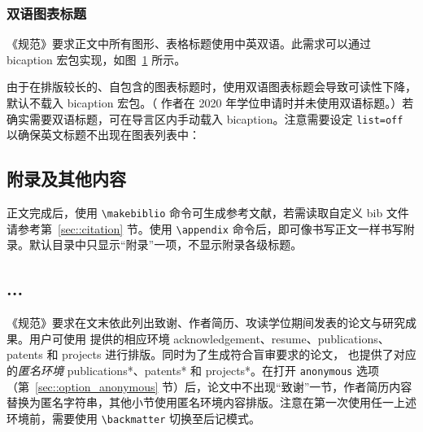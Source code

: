\documentclass[doctor]{shtthesis}
\begin{document}
\subsection{双语图表标题}
《规范》要求正文中所有图形、表格标题使用中英双语。此需求可以通过 \textsf{bicaption} 宏包实现，如图~\ref{img::sht_logo} 所示。
\begin{figure}[htb]
  \centering
  \label{img::sht_logo}
\end{figure}

由于在排版较长的、自包含的图表标题时，使用双语图表标题会导致可读性下降，\shtthesis{} 默认不载入 \textsf{bicaption} 宏包。（ \shtthesis{} 作者在 2020 年学位申请时并未使用双语标题。）若确实需要双语标题，可在导言区内手动载入 \textsf{bicaption}。注意需要设定 \verb|list=off| 以确保英文标题不出现在图表列表中：
\begin{latex}
\usepackage[list=off]{bicaption}
\captionsetup[figure][bi-second]{name=Figure}
\captionsetup[table][bi-second]{name=Table}
\end{latex}

\section{附录及其他内容} \label{sec::backmatter}
正文完成后，使用 \verb|\makebiblio| 命令可生成参考文献，若需读取自定义 bib 文件请参考第~\ref{sec::citation} 节。使用 \verb|\appendix| 命令后，即可像书写正文一样书写附录。默认目录中只显示“附录”一项，不显示附录各级标题。
\begin{latex}
\appendix
\chapter{...}
\end{latex}

《规范》要求在文末依此列出致谢、作者简历、攻读学位期间发表的论文与研究成果。用户可使用 \shtthesis{} 提供的相应环境 acknowledgement、resume、publications、patents 和 projects 进行排版。同时为了生成符合盲审要求的论文，\shtthesis{} 也提供了对应的\emph{匿名环境} publications*、patents* 和 projects*。在打开 \verb|anonymous| 选项（第~\ref{sec::option_anonymous} 节）后，论文中不出现“致谢”一节，作者简历内容替换为匿名字符串，其他小节使用匿名环境内容排版。注意在第一次使用任一上述环境前，需要使用 \verb|\backmatter| 切换至后记模式。
\end{document}
